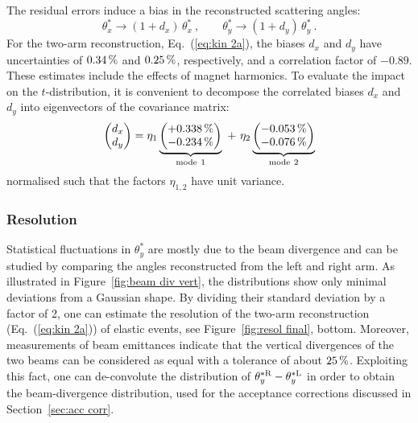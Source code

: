 The residual errors induce a bias in the reconstructed scattering angles:
\begin{equation}
\label{eq:opt bias}
	\theta_x^* \rightarrow (1 + d_x)\, \theta_x^*\ ,\qquad
	\theta_y^* \rightarrow (1 + d_y)\, \theta_y^*\ .
\end{equation}
For the two-arm reconstruction, Eq.~(\ref{eq:kin 2a}), the biases $d_x$ and $d_y$ have uncertainties of $0.34\,{\rm \%}$ and $0.25\,{\rm \%}$, respectively, and a correlation factor of $-0.89$. These estimates include the effects of magnet harmonics. To evaluate the impact on the $t$-distribution, it is convenient to decompose the correlated biases $d_x$ and $d_y$ into eigenvectors of the covariance matrix:
\begin{equation}
\label{eq:opt bias modes}
\begin{pmatrix} d_x\cr d_y \end{pmatrix} =
	\eta_1 \underbrace{\begin{pmatrix} +0.338\,{\rm \%} \cr -0.234\,{\rm \%} \end{pmatrix}}_{\rm mode\ 1}
	\ +\ \eta_2 \underbrace{\begin{pmatrix} -0.053\,{\rm \%} \cr -0.076\,{\rm \%} \end{pmatrix}}_{\rm mode\ 2}
\end{equation}
normalised such that the factors $\eta_{1,2}$ have unit variance.



\subsubsection{Resolution}
\label{sec:resolution}

Statistical fluctuations in $\theta_y^*$ are mostly due to the beam divergence and can be studied by comparing the angles reconstructed from the left and right arm. As illustrated in Figure~\ref{fig:beam div vert}, the distributions show only minimal deviations from a Gaussian shape. By dividing their standard deviation by a factor of 2, one can estimate the resolution of the two-arm reconstruction (Eq.~(\ref{eq:kin 2a})) of elastic events, see Figure~\ref{fig:resol final}, bottom. Moreover, measurements of beam emittances \cite{op-elog} indicate that the vertical divergences of the two beams can be considered as equal with a tolerance of about $25\,{\rm \%}$. Exploiting this fact, one can de-convolute the distribution of $\theta_y^{*\rm R} - \theta_y^{*\rm L}$ in order to obtain the beam-divergence distribution, used for the acceptance corrections discussed in Section~\ref{sec:acc corr}.

